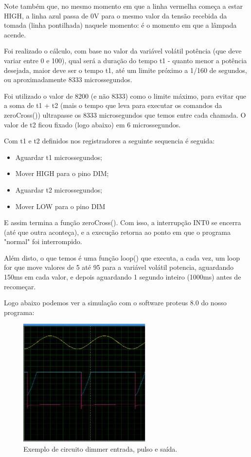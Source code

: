 Note também que, no mesmo momento em que a linha vermelha começa a estar HIGH, a linha azul passa de 0V para o mesmo valor da tensão recebida da tomada (linha pontilhada) naquele momento: é o momento em que a lâmpada acende.

Foi realizado o cálculo, com base no valor da variável volátil potência (que deve variar entre 0 e 100), qual será a duração do tempo t1 - quanto menor a potência desejada, maior deve ser o tempo t1, até um limite próximo a 1/160 de segundos, ou aproximadamente 8333 microssegundos.

Foi utilizado o valor de  8200 (e não 8333) como o limite máximo, para evitar que a soma de t1 + t2 (mais o tempo que leva para executar os comandos da zeroCross()) ultrapasse os 8333 microsegundos que temos entre cada chamada. O valor de  t2 ficou fixado (logo abaixo) em 6 microssegundos.

Com t1 e t2 definidos nos registradores a seguinte sequencia é seguida:

\begin{itemize}
	\item Aguardar t1 microssegundos;
	\item Mover HIGH para o pino DIM;
	\item Aguardar t2 microssegundos;
	\item Mover LOW para o pino DIM
\end{itemize}

E assim termina a função zeroCross(). Com isso, a interrupção INT0 se encerra (até que outra aconteça), e a execução retorna ao ponto em que o programa "normal" foi interrompido.

Além disto, o que temos é uma função loop() que executa, a cada vez, um loop for que move valores de 5 até 95 para a variável volátil potencia, aguardando 150ms em cada valor, e depois aguardando 1 segundo inteiro (1000ms) antes de recomeçar.

Logo abaixo podemos ver a simulação com o software proteus 8.0 do nosso programa:

		\begin{figure}[H]
			\begin{center}
				\includegraphics[scale = 1]{figuras/Simulacao_Dimmer}
				\caption{Exemplo de circuito dimmer entrada, pulso e saída.}
			\end{center}
		\end{figure}

